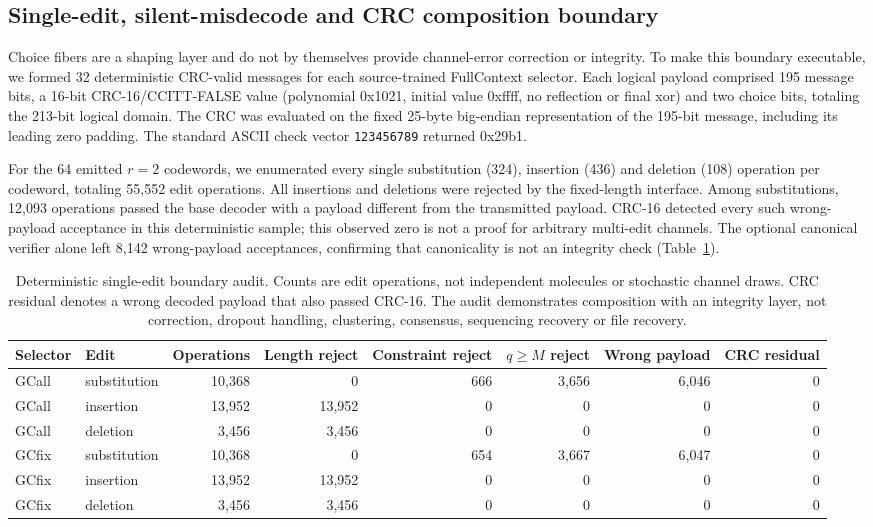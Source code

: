 \documentclass[10pt]{article}
\begin{document}
\subsection{Single-edit, silent-misdecode and CRC composition boundary}

Choice fibers are a shaping layer and do not by themselves provide channel-error correction or integrity. To make this boundary executable, we formed 32 deterministic CRC-valid messages for each source-trained FullContext selector. Each logical payload comprised 195 message bits, a 16-bit CRC-16/CCITT-FALSE value (polynomial 0x1021, initial value 0xffff, no reflection or final xor) and two choice bits, totaling the 213-bit logical domain. The CRC was evaluated on the fixed 25-byte big-endian representation of the 195-bit message, including its leading zero padding. The standard ASCII check vector \texttt{123456789} returned 0x29b1.

For the 64 emitted $r=2$ codewords, we enumerated every single substitution (324), insertion (436) and deletion (108) operation per codeword, totaling 55,552 edit operations. All insertions and deletions were rejected by the fixed-length interface. Among substitutions, 12,093 operations passed the base decoder with a payload different from the transmitted payload. CRC-16 detected every such wrong-payload acceptance in this deterministic sample; this observed zero is not a proof for arbitrary multi-edit channels. The optional canonical verifier alone left 8,142 wrong-payload acceptances, confirming that canonicality is not an integrity check (Table~\ref{tab:s-channel-boundary}).

\begin{table}[H]
\centering
\scriptsize
\begin{tabular}{llrrrrrr}
\toprule
Selector & Edit & Operations & Length reject & Constraint reject & $q\geq M$ reject & Wrong payload & CRC residual \\
\midrule
GCall & substitution & 10,368 & 0 & 666 & 3,656 & 6,046 & 0 \\
GCall & insertion & 13,952 & 13,952 & 0 & 0 & 0 & 0 \\
GCall & deletion & 3,456 & 3,456 & 0 & 0 & 0 & 0 \\
GCfix & substitution & 10,368 & 0 & 654 & 3,667 & 6,047 & 0 \\
GCfix & insertion & 13,952 & 13,952 & 0 & 0 & 0 & 0 \\
GCfix & deletion & 3,456 & 3,456 & 0 & 0 & 0 & 0 \\
\bottomrule
\end{tabular}
\caption{Deterministic single-edit boundary audit. Counts are edit operations, not independent molecules or stochastic channel draws. CRC residual denotes a wrong decoded payload that also passed CRC-16. The audit demonstrates composition with an integrity layer, not correction, dropout handling, clustering, consensus, sequencing recovery or file recovery.}
\label{tab:s-channel-boundary}
\end{table}
\end{document}
